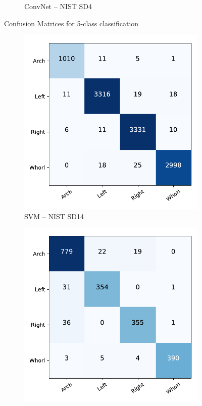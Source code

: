 \begin{figure}[!ht]
\begin{subfigure}[b]{0.25\textwidth}
		\caption{ConvNet -- NIST SD4 }
		\label{fig.cnf_matrix_5class.net_sd4}
	\end{subfigure}
	\caption{Confusion Matrices for 5-class classification}\label{fig.cnf_matrix_5class}
\end{figure}

\begin{figure}[!ht]
	\begin{subfigure}[b]{0.25\textwidth}
		\centering
		\includegraphics[width=\linewidth]{fig/figs/confusion_matrix_svm_sd14_4class.pdf}
		\caption{SVM -- NIST SD14 }
		\label{fig.cnf_matrix_4class.svm_sd14}
	\end{subfigure}%
	\begin{subfigure}[b]{0.25\textwidth}
		\centering
		\includegraphics[width=\linewidth]{fig/figs/confusion_matrix_svm_sd4_4class_cross_subject.pdf}

\end{subfigure}
\end{figure}

